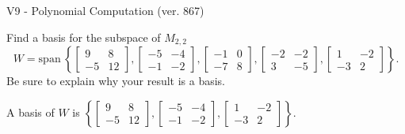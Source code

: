 \begin{exercise}
  \begin{exerciseTitle}V9 - Polynomial Computation (ver. 867)\end{exerciseTitle}
  \begin{exerciseStatement}
    Find a basis for the subspace of \(M_{2,2}\) 
\[W=\mathrm{span}\ \left\{\left[\begin{array}{cc}
9 & 8 \\
-5 & 12
\end{array}\right] , \left[\begin{array}{cc}
-5 & -4 \\
-1 & -2
\end{array}\right] , \left[\begin{array}{cc}
-1 & 0 \\
-7 & 8
\end{array}\right] , \left[\begin{array}{cc}
-2 & -2 \\
3 & -5
\end{array}\right] , \left[\begin{array}{cc}
1 & -2 \\
-3 & 2
\end{array}\right]\right\}.\]
 Be sure to explain why your result is a basis.


  \end{exerciseStatement}
  \begin{exerciseAnswer}
   A basis of \(W\) is  \(\left\{\left[\begin{array}{cc}
9 & 8 \\
-5 & 12
\end{array}\right] , \left[\begin{array}{cc}
-5 & -4 \\
-1 & -2
\end{array}\right] , \left[\begin{array}{cc}
1 & -2 \\
-3 & 2
\end{array}\right]\right\}\).
  


  \end{exerciseAnswer}
\end{exercise}